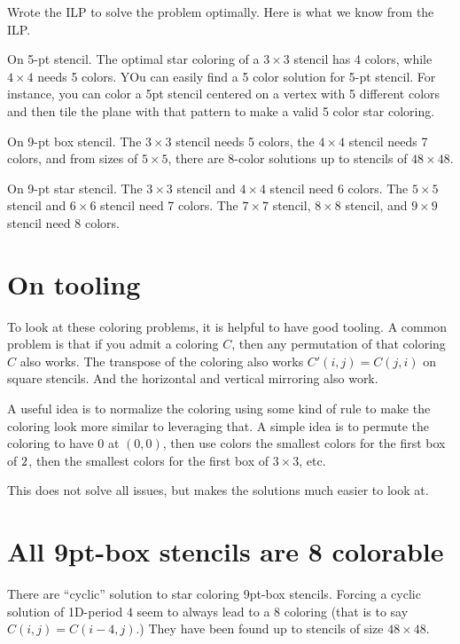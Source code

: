 \documentclass{article}
\begin{document}
Wrote the ILP to solve the problem optimally. Here is what we know
from the ILP.

On 5-pt stencil. The optimal star coloring of a $3 \times 3$ stencil
has 4 colors, while $4 \times 4$ needs 5 colors. YOu can easily find a
5 color solution for 5-pt stencil. For instance, you can color a 5pt stencil
centered on a vertex with 5 different colors and then tile the plane
with that pattern to make a valid 5 color star coloring.

On 9-pt box stencil. The $3 \times 3$ stencil needs 5 colors, the $4
\times 4$ stencil needs 7 colors, and from sizes of $5 \times 5$,
there are 8-color solutions up to stencils of $48 \times 48$.

On 9-pt star stencil. The $3 \times 3$ stencil and $4 \times 4$
stencil need 6 colors. The $5 \times 5$ stencil and $6 \times 6$
stencil need 7 colors. The $7 \times 7$ stencil, $8 \times 8$ stencil,
and $9 \times 9$ stencil need 8 colors.

\section{On tooling}

To look at these coloring problems, it is helpful to have good
tooling. A common problem is that if you admit a coloring $C$, then
any permutation of that coloring $C$ also works. The transpose of the
coloring also works $C'(i,j) = C(j,i)$ on square stencils. And the
horizontal and vertical mirroring also work.

A useful idea is to normalize the coloring using some kind of rule to
make the coloring look more similar to leveraging that. A simple idea
is to permute the coloring to have 0 at $(0,0)$, then use colors the
smallest colors for the first box of $2\time 2$, then the smallest
colors for the first box of $3 \times 3$, etc.

This does not solve all issues, but makes the solutions much easier to
look at.

\section{All 9pt-box stencils are 8 colorable}

There are ``cyclic'' solution to star coloring 9pt-box
stencils. Forcing a cyclic solution of 1D-period $4$ seem to always
lead to a 8 coloring (that is to say $C(i,j) = C(i-4,j)$.) They have
been found up to stencils of size $48 \times 48$.
\end{document}
